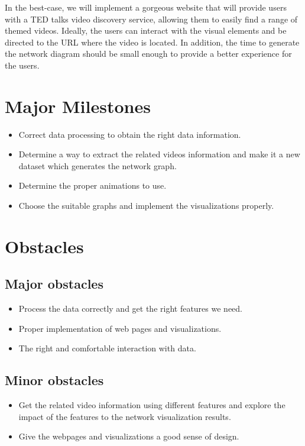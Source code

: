 \documentclass{proc}
\begin{document}
In the best-case, we will implement a gorgeous website that will provide users with a TED talks video discovery service, allowing them to easily find a range of themed videos. Ideally, the users can interact with the visual elements and be directed to the URL where the video is located.
In addition, the time to generate the network diagram should be small enough to provide a better experience for the users.

\section{Major Milestones}
\begin{itemize}
    \item Correct data processing to obtain the right data information.
    \item Determine a way to extract the related videos information and make it a new dataset which generates the network graph.
    \item Determine the proper animations to use.
    \item Choose the suitable graphs and implement the visualizations properly.
    
\end{itemize}

\section{Obstacles}

\subsection{Major obstacles} %
\begin{itemize}
    \item Process the data correctly and get the right features we need.
    \item Proper implementation of web pages and visualizations.
    \item The right and comfortable interaction with data.
\end{itemize}

\subsection{Minor obstacles}
\begin{itemize}
    \item Get the related video information using different features and explore the impact of the features to the network visualization results.
    \item Give the webpages and visualizations a good sense of design.
\end{itemize}
\end{document}
